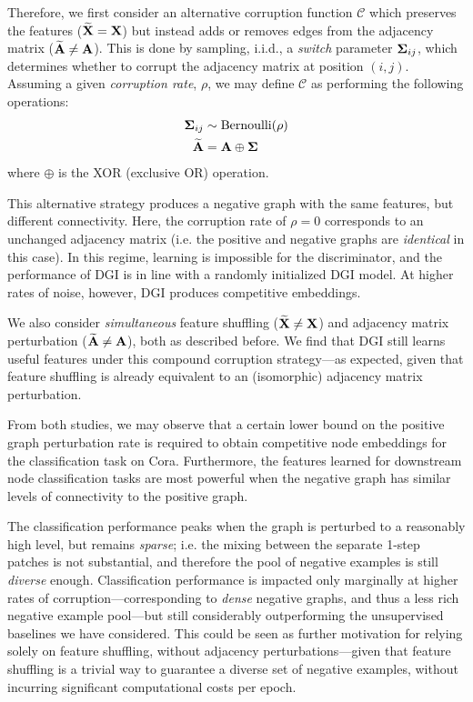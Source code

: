 \documentclass{article} \usepackage{iclr2019_conference,times}
\begin{document}
Therefore, we first consider an alternative corruption function $\mathcal{C}$ which preserves the features ($\bf \widetilde{X} = \bf X$) but instead adds or removes edges from the adjacency matrix ($\bf \widetilde{A} \neq \bf A$). This is done by sampling, i.i.d., a \emph{switch} parameter ${\bf\Sigma}_{ij}$, which determines whether to corrupt the adjacency matrix at position $(i, j)$. Assuming a given \emph{corruption rate}, $\rho$, we may define $\mathcal{C}$ as performing the following operations:
\begin{align}
    {\bf\Sigma}_{ij} &\sim \text{Bernoulli}(\rho)\\
    {\bf \widetilde{A}} &= {\bf A} \oplus {\bf\Sigma}
\end{align}
where $\oplus$ is the XOR (exclusive OR) operation.

This alternative strategy produces a negative graph with the same features, but different connectivity.  Here, the corruption rate of $\rho=0$ corresponds to an unchanged adjacency matrix (i.e. the positive and negative graphs are \emph{identical} in this case). In this regime, learning is impossible for the discriminator, and the performance of DGI is in line with a randomly initialized DGI model. At higher rates of noise, however, DGI produces competitive embeddings.

We also consider \textit{simultaneous} feature shuffling ($\bf \widetilde{X} \neq \bf X$) and adjacency matrix perturbation (${\bf \widetilde{A}} \neq {\bf A}$), both as described before. We find that DGI still learns useful features under this compound corruption strategy---as expected, given that feature shuffling is already equivalent to an (isomorphic) adjacency matrix perturbation.

From both studies, we may observe that a certain lower bound on the positive graph perturbation rate is required to obtain competitive node embeddings for the classification task on Cora. Furthermore, the features learned for downstream node classification tasks are most powerful when the negative graph has similar levels of connectivity to the positive graph. 

The classification performance peaks when the graph is perturbed to a reasonably high level, but remains \emph{sparse}; i.e. the mixing between the separate 1-step patches is not substantial, and therefore the pool of negative examples is still \emph{diverse} enough. Classification performance is impacted only marginally at higher rates of corruption---corresponding to \emph{dense} negative graphs, and thus a less rich negative example pool---but still considerably outperforming the unsupervised baselines we have considered. This could be seen as further motivation for relying solely on feature shuffling, without adjacency perturbations---given that feature shuffling is a trivial way to guarantee a diverse set of negative examples, without incurring significant computational costs per epoch.
\end{document}
